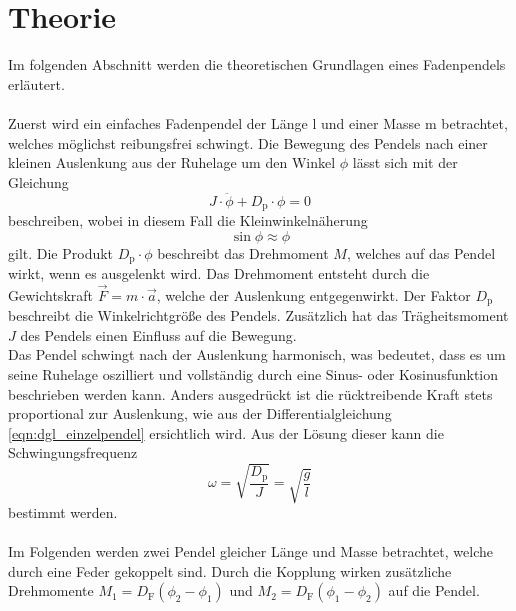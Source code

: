 \section{Theorie}
\label{sec:theorie}

    Im folgenden Abschnitt werden die theoretischen Grundlagen eines Fadenpendels erläutert.\\
    \\
    Zuerst wird ein einfaches Fadenpendel der Länge l und einer Masse m betrachtet,
    welches möglichst reibungsfrei schwingt.
    Die Bewegung des Pendels nach einer kleinen Auslenkung aus der Ruhelage um den Winkel $\phi$ lässt sich mit der Gleichung
    \begin{equation*}
        J \cdot \ddot{\phi} + D_\text{p} \cdot \phi = 0
        \label{eqn:dgl_einzelpendel}
    \end{equation*}
    beschreiben,
    wobei in diesem Fall die Kleinwinkelnäherung
    \begin{equation}
        \sin{\phi} \approx \phi
        \label{eqn:kleinwinkelnaeherung}
    \end{equation}
    gilt.
    Die Produkt $D_\text{p} \cdot \phi$ beschreibt das Drehmoment $M$,
    welches auf das Pendel wirkt,
    wenn es ausgelenkt wird.
    Das Drehmoment entsteht durch die Gewichtskraft $\vec{F} = m \cdot \vec{a}$,
    welche der Auslenkung entgegenwirkt.
    Der Faktor $D_\text{p}$ beschreibt die Winkelrichtgröße des Pendels.
    Zusätzlich hat das Trägheitsmoment $J$ des Pendels einen Einfluss auf die Bewegung.\\
    Das Pendel schwingt nach der Auslenkung harmonisch,
    was bedeutet,
    dass es um seine Ruhelage oszilliert und vollständig durch eine Sinus- oder Kosinusfunktion beschrieben werden kann.
    Anders ausgedrückt ist die rücktreibende Kraft stets proportional zur Auslenkung,
    wie aus der Differentialgleichung \eqref{eqn:dgl_einzelpendel} ersichtlich wird.
    Aus der Lösung dieser kann die Schwingungsfrequenz
    \begin{equation*}
        \omega = \sqrt{\frac{D_\text{p}}{J}} = \sqrt{\frac{g}{l}}
    \end{equation*}
    bestimmt werden.\\
    \\
    Im Folgenden werden zwei Pendel gleicher Länge und Masse betrachtet,
    welche durch eine Feder gekoppelt sind.
    Durch die Kopplung wirken zusätzliche Drehmomente $M_1 = D_\text{F}(\phi_2 - \phi_1)$ und $M_2 = D_\text{F}(\phi_1 - \phi_2)$ auf die Pendel.
